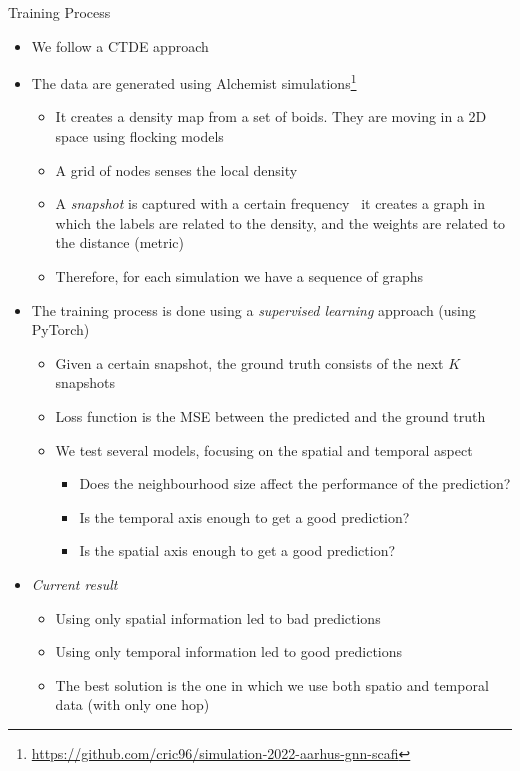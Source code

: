 \documentclass[presentation, 9pt]{beamer}\mode<presentation>{\usetheme{AMSBolognaFC}}
\begin{document}
\begin{frame}{Training Process}
\begin{itemize}
	\item We follow a CTDE approach
	\item The data are generated using Alchemist simulations\footnote{\url{https://github.com/cric96/simulation-2022-aarhus-gnn-scafi}}
	\begin{itemize}
		\item It creates a density map from a set of boids. They are moving in a 2D space using flocking models
		\item A grid of nodes senses the local density 
		\item A \emph{snapshot} is captured with a certain frequency \faArrowRight \, it creates a graph in which the labels are related to the density, and the weights are related to the distance (metric)
		\item  Therefore, for each simulation we have a sequence of graphs
	\end{itemize}
	\item The training process is done using a \emph{supervised learning} approach (using PyTorch)
	\begin{itemize}
		\item Given a certain snapshot, the ground truth consists of the next $K$ snapshots
		\item Loss function is the MSE between the predicted and the ground truth
	\item We test several models, focusing on the spatial and temporal aspect
	\begin{itemize}
		\item Does the neighbourhood size affect the performance of the prediction? 
		\item Is the temporal axis enough to get a good prediction?
		\item Is the spatial axis enough to get a good prediction?
	\end{itemize}
	\end{itemize}
	\item \emph{Current result}
	\begin{itemize}
		\item Using only spatial information led to bad predictions
		\item Using only temporal information led to good predictions
		\item The best solution is the one in which we use both spatio and temporal data (with only one hop)
	\end{itemize}

\end{itemize}
\end{frame}
\end{document}
